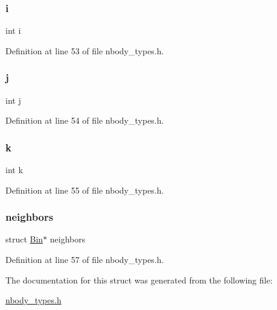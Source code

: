 \hypertarget{struct_bin_acb559820d9ca11295b4500f179ef6392}{}\label{struct_bin_acb559820d9ca11295b4500f179ef6392} 
\subsubsection{\texorpdfstring{i}{i}}
{\footnotesize\ttfamily int i}



Definition at line 53 of file nbody\+\_\+types.\+h.

\hypertarget{struct_bin_a37d972ae0b47b9099e30983131d31916}{}\label{struct_bin_a37d972ae0b47b9099e30983131d31916} 
\subsubsection{\texorpdfstring{j}{j}}
{\footnotesize\ttfamily int j}



Definition at line 54 of file nbody\+\_\+types.\+h.

\hypertarget{struct_bin_ab66ed8e0098c0a86b458672a55a9cca9}{}\label{struct_bin_ab66ed8e0098c0a86b458672a55a9cca9} 
\subsubsection{\texorpdfstring{k}{k}}
{\footnotesize\ttfamily int k}



Definition at line 55 of file nbody\+\_\+types.\+h.

\hypertarget{struct_bin_a4c64e88a16c43b567dfe1c1695ee10fb}{}\label{struct_bin_a4c64e88a16c43b567dfe1c1695ee10fb} 
\subsubsection{\texorpdfstring{neighbors}{neighbors}}
{\footnotesize\ttfamily struct \hyperlink{struct_bin}{Bin}$\ast$ neighbors}



Definition at line 57 of file nbody\+\_\+types.\+h.



The documentation for this struct was generated from the following file\+:\begin{DoxyCompactItemize}
\item 
\hyperlink{nbody__types_8h}{nbody\+\_\+types.\+h}\end{DoxyCompactItemize}
